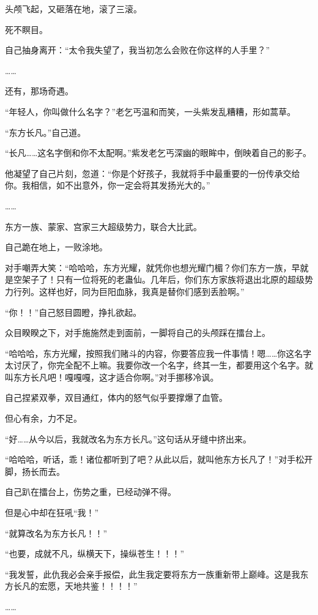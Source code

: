\begin{this_body}
头颅飞起，又砸落在地，滚了三滚。

死不瞑目。

自己抽身离开：“太令我失望了，我当初怎么会败在你这样的人手里？”

……

还有，那场奇遇。

“年轻人，你叫做什么名字？”老乞丐温和而笑，一头紫发乱糟糟，形如蒿草。

“东方长凡。”自己道。

“长凡……这名字倒和你不太配啊。”紫发老乞丐深幽的眼眸中，倒映着自己的影子。

他凝望了自己片刻，忽道：“你是个好孩子，我就将手中最重要的一份传承交给你。我相信，如不出意外，你一定会将其发扬光大的。”

……

东方一族、蒙家、宫家三大超级势力，联合大比武。

自己跪在地上，一败涂地。

对手嘲弄大笑：“哈哈哈，东方光耀，就凭你也想光耀门楣？你们东方一族，早就是空架子了！只有一位将死的老蛊仙。几年后，你们东方家族将退出北原的超级势力行列。这样也好，同为巨阳血脉，我真是替你们感到丢脸啊。”

“你！！”自己怒目圆瞪，挣扎欲起。

众目睽睽之下，对手施施然走到面前，一脚将自己的头颅踩在擂台上。

“哈哈哈，东方光耀，按照我们赌斗的内容，你要答应我一件事情！嗯……你这名字太讨厌了，你完全配不上嘛。我要你改一个名字，终其一生，都要用这个名字。就叫东方长凡吧！嘎嘎嘎，这才适合你啊。”对手挪移冷讽。

自己捏紧双拳，双目通红，体内的怒气似乎要撑爆了血管。

但心有余，力不足。

“好……从今以后，我就改名为东方长凡。”这句话从牙缝中挤出来。

“哈哈哈，听话，乖！诸位都听到了吧？从此以后，就叫他东方长凡了！”对手松开脚，扬长而去。

自己趴在擂台上，伤势之重，已经动弹不得。

但是心中却在狂吼“我！”

“就算改名为东方长凡！！”

“也要，成就不凡，纵横天下，操纵苍生！！！”

“我发誓，此仇我必会亲手报偿，此生我定要将东方一族重新带上巅峰。这是我东方长凡的宏愿，天地共鉴！！！！”

……


\end{this_body}
